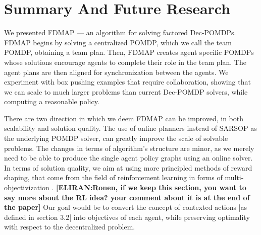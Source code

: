 \documentclass[letterpaper]{article} %
\theoremstyle{definition}
\newcommand{\commentout}[1]{}
\newcommand{\eliran}[1]{\textbf{[\color{red}ELIRAN:#1]}}
\newcommand{\ronen}[1]{\textbf{[\color{blue}RONEN:#1]}}
\begin{document}
\section{Summary And Future Research}
We presented FDMAP --- an algorithm for solving factored Dec-POMDPs. FDMAP begins by solving a centralized POMDP, which we call the team POMDP, obtaining a team plan. Then, FDMAP creates agent specific POMDPs whose solutions encourage agents to complete their role in the team plan. The agent plans are then aligned for synchronization between the agents. We experiment with box pushing examples that require collaboration, showing that we can scale to much larger problems than current Dec-POMDP solvers, while computing a reasonable policy.

There are two direction in which we deem FDMAP can be improved, in both scalability and solution quality.
The use of online planners instead of SARSOP as the underlying POMDP solver, can greatly improve the scale of solvable problems. The changes in terms of algorithm's structure are minor, as we merely need to be able to produce the single agent policy graphs using an online solver.
In terms of solution quality, we aim at using more principled methods of reward shaping, that come from the field of reinforcement learning in forms of multi-objectivization \cite{REWARDSHAPING}.
\eliran{Ronen, if we keep this section, you want to say more about the RL idea? your comment about it is at the end of the paper}
Our goal would be to convert the concept of contexted actions |as defined in section 3.2| into objectives of each agent, while preserving optimality with respect to the decentralized problem.

\commentout{
There are two direction in which we deem FDMAP can be improved, in both scalability and solution quality.
The use of online planners instead of SARSOP as the POMDP solver, can greatly improve the scale of solvable problems. The changes in terms of algorithm architecture are minor, as we merely need to be able to produce the single agent policy graphs using an online solver. \ronen{In fact, it seems we could use an RL algorithm here to generate a policy for each agent, as we can simulate as many traces as we wish.
In fact, we could use the RL algorithm to solve the team POMDP. This would generate the needed traces as well. We would learn incrementally
both the team solution and the single-agent solution. Using this idea, we could probably scale up to very large problems. In fact, we can use this
approach to do MA RL. If we can do the projections. What we need is a simulator that let's us control all the agents at once.}
In terms of solution quality, we aim at using more principled methods of reward shaping, that come from the worlds of reinforcement learning in forms of multi-objectivization \cite{REWARDSHAPING}.
Our goal would be to convert the concept of contexted actions |as defined in section 3.2| into objectives of each agent, while preserving optimality with respect to the decentralized problem.
}



\end{document}
